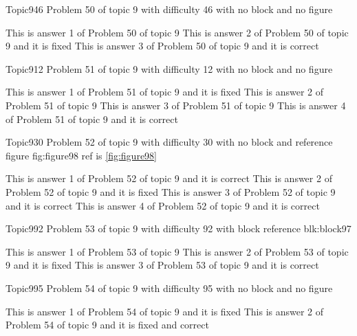 \documentclass[master]{exam}
\begin{document}
\begin{problem}{Topic9}{46}
	Problem 50 of topic 9 with difficulty 46 with no block and no figure
	\begin{answers}
		\answer This is answer 1 of Problem 50 of topic 9 
		\answer[fixed] This is answer 2 of Problem 50 of topic 9 and it is fixed
		\answer[correct] This is answer 3 of Problem 50 of topic 9 and it is correct
	\end{answers}
\end{problem}

\begin{problem}{Topic9}{12}
	Problem 51 of topic 9 with difficulty 12 with no block and no figure
	\begin{answers}
		\answer[fixed] This is answer 1 of Problem 51 of topic 9 and it is fixed
		\answer This is answer 2 of Problem 51 of topic 9 
		\answer This is answer 3 of Problem 51 of topic 9 
		\answer[correct] This is answer 4 of Problem 51 of topic 9 and it is correct
	\end{answers}
\end{problem}

\begin{problem}{Topic9}{30}
	Problem 52 of topic 9 with difficulty 30 with no block and reference figure fig:figure98 ref is \ref{fig:figure98}
	\begin{answers}
		\answer[correct] This is answer 1 of Problem 52 of topic 9 and it is correct
		\answer[fixed] This is answer 2 of Problem 52 of topic 9 and it is fixed
		\answer[correct] This is answer 3 of Problem 52 of topic 9 and it is correct
		\answer[correct] This is answer 4 of Problem 52 of topic 9 and it is correct
	\end{answers}
\end{problem}

\begin{problem}[requires=blk:block97]{Topic9}{92}
	Problem 53 of topic 9 with difficulty 92 with block reference blk:block97
	\begin{answers}
		\answer This is answer 1 of Problem 53 of topic 9 
		\answer[fixed] This is answer 2 of Problem 53 of topic 9 and it is fixed
		\answer[correct] This is answer 3 of Problem 53 of topic 9 and it is correct
	\end{answers}
\end{problem}

\begin{problem}{Topic9}{95}
	Problem 54 of topic 9 with difficulty 95 with no block and no figure
	\begin{answers}
		\answer[fixed] This is answer 1 of Problem 54 of topic 9 and it is fixed
		 This is answer 2 of Problem 54 of topic 9 and it is fixed and correct
	\end{answers}
\end{problem}
\end{document}
